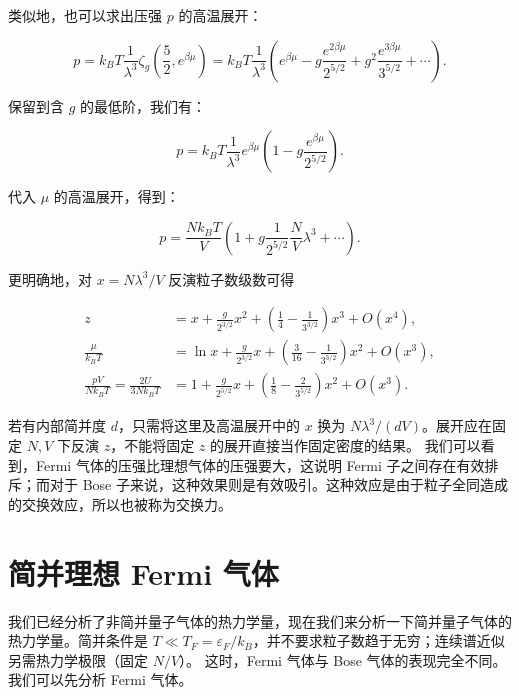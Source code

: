 类似地，也可以求出压强 $p$ 的高温展开：
\begin{linenomath}\begin{equation}
    p = k_B T \frac{1}{\lambda^3} \zeta_g\left( \frac{5}{2}, e^{\beta\mu} \right) = k_B T \frac{1}{\lambda^3} \left( e^{\beta\mu} - g \frac{e^{2\beta\mu}}{2^{5/2}} + g^2 \frac{e^{3\beta\mu}}{3^{5/2}} + \cdots \right).
\end{equation}\end{linenomath}
保留到含 $g$ 的最低阶，我们有：
\begin{linenomath}\begin{equation}
    p = k_B T \frac{1}{\lambda^3} e^{\beta\mu} \left( 1 - g \frac{e^{\beta\mu}}{2^{5/2}} \right).
\end{equation}\end{linenomath}
代入 $\mu$ 的高温展开，得到：
\begin{linenomath}\begin{equation}
    p = \frac{N k_B T}{V} \left( 1 + g \frac{1}{2^{5/2}} \frac{N}{V} \lambda^3 + \cdots \right).
\end{equation}\end{linenomath}
更明确地，对 $x=N\lambda^3/V$ 反演粒子数级数可得
\begin{linenomath}\begin{align}
 z&=x+\frac{g}{2^{3/2}}x^2+\left(\frac14-\frac{1}{3^{3/2}}\right)x^3+O(x^4),\\
 \frac{\mu}{k_BT}&=\ln x+\frac{g}{2^{3/2}}x+\left(\frac{3}{16}-\frac{1}{3^{3/2}}\right)x^2+O(x^3),\\
 \frac{pV}{Nk_BT}=\frac{2U}{3Nk_BT}&=1+\frac{g}{2^{5/2}}x+\left(\frac18-\frac{2}{3^{5/2}}\right)x^2+O(x^3).
\end{align}\end{linenomath}
若有内部简并度 $d$，只需将这里及高温展开中的 $x$ 换为 $N\lambda^3/(dV)$。展开应在固定 $N,V$ 下反演 $z$，不能将固定 $z$ 的展开直接当作固定密度的结果。
我们可以看到，Fermi 气体的压强比理想气体的压强要大，这说明 Fermi 子之间存在有效排斥；而对于 Bose 子来说，这种效果则是有效吸引。这种效应是由于粒子全同造成的交换效应，所以也被称为交换力。

\section{简并理想 Fermi 气体}
我们已经分析了非简并量子气体的热力学量，现在我们来分析一下简并量子气体的热力学量。简并条件是 $T\ll T_F=\varepsilon_F/k_B$，并不要求粒子数趋于无穷；连续谱近似另需热力学极限（固定 $N/V$）。 这时，Fermi 气体与 Bose 气体的表现完全不同。我们可以先分析 Fermi 气体。

